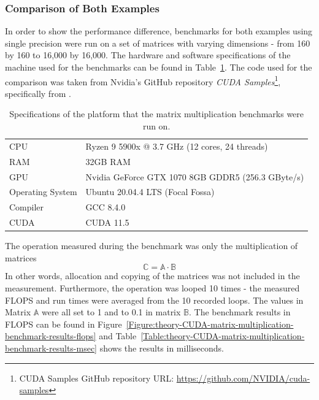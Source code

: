 \subsubsection{Comparison of Both Examples}\label{Subsubsection:matrix-multiplication-comparison-of-examples}
In order to show the performance difference, benchmarks for both examples using single precision were run on a set of matrices with varying dimensions - from 160 by 160 to 16,000 by 16,000. The hardware and software specifications of the machine used for the benchmarks can be found in Table~\ref{Table:theory-CUDA-matrix-multiplication-benchmark-system}. The code used for the comparison was taken from Nvidia's GitHub repository  \textit{CUDA Samples}\footnote{CUDA Samples GitHub repository URL: \url{https://github.com/NVIDIA/cuda-samples}}, specifically from .

\begin{table}[h]
	\centering
	\begin{tabular}{|l|l|}
		\hline
		CPU              & Ryzen 9 5900x @ 3.7 GHz (12 cores, 24 threads) \\
		RAM              & 32GB RAM \\
		GPU              & Nvidia GeForce GTX 1070 8GB GDDR5 (256.3 GByte/s)\\
		Operating System & Ubuntu 20.04.4 LTS (Focal Fossa) \\
		Compiler         & GCC 8.4.0 \\
		CUDA             & CUDA 11.5 \\ \hline
	\end{tabular}
	\caption{Specifications of the platform that the matrix multiplication benchmarks were run on.}
	\label{Table:theory-CUDA-matrix-multiplication-benchmark-system}
\end{table}

The operation measured during the benchmark was only the multiplication of matrices
$$ \mathbb{C} = \mathbb{A} \cdot \mathbb{B} $$
In other words, allocation and copying of the matrices was not included in the measurement. Furthermore, the operation was looped 10 times - the measured FLOPS and run times were averaged from the 10 recorded loops. The values in Matrix $ \mathbb{A} $ were all set to 1 and to 0.1 in matrix $ \mathbb{B} $. The benchmark results in FLOPS can be found in Figure~\ref{Figure:theory-CUDA-matrix-multiplication-benchmark-results-flops} and Table~\ref{Table:theory-CUDA-matrix-multiplication-benchmark-results-msec} shows the results in milliseconds.

